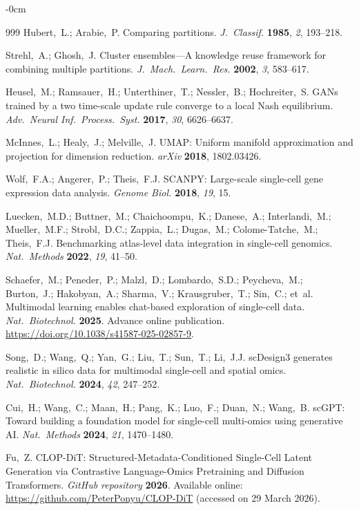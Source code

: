 \documentclass[genes,article,submit,pdftex,oneauthor]{Definitions/mdpi}
\begin{document}
\begin{adjustwidth}{-\extralength}{0cm}
\begin{thebibliography}{999}
Hubert,~L.; Arabie,~P. Comparing partitions. {\em J.\ Classif.} {\bf 1985}, {\em 2}, 193--218.

Strehl,~A.; Ghosh,~J. Cluster ensembles---A knowledge reuse framework for combining multiple partitions. {\em J.\ Mach.\ Learn.\ Res.} {\bf 2002}, {\em 3}, 583--617.

Heusel,~M.; Ramsauer,~H.; Unterthiner,~T.; Nessler,~B.; Hochreiter,~S. GANs trained by a two time-scale update rule converge to a local Nash equilibrium. {\em Adv.\ Neural Inf.\ Process.\ Syst.} {\bf 2017}, {\em 30}, 6626--6637.

McInnes,~L.; Healy,~J.; Melville,~J. UMAP: Uniform manifold approximation and projection for dimension reduction. {\em arXiv} {\bf 2018}, 1802.03426.

Wolf,~F.A.; Angerer,~P.; Theis,~F.J. SCANPY: Large-scale single-cell gene expression data analysis. {\em Genome Biol.} {\bf 2018}, {\em 19}, 15.

Luecken,~M.D.; Buttner,~M.; Chaichoompu,~K.; Danese,~A.; Interlandi,~M.; Mueller,~M.F.; Strobl,~D.C.; Zappia,~L.; Dugas,~M.; Colome-Tatche,~M.; Theis,~F.J. Benchmarking atlas-level data integration in single-cell genomics. {\em Nat.\ Methods} {\bf 2022}, {\em 19}, 41--50.

Schaefer,~M.; Peneder,~P.; Malzl,~D.; Lombardo,~S.D.; Peycheva,~M.; Burton,~J.; Hakobyan,~A.; Sharma,~V.; Krausgruber,~T.; Sin,~C.; et~al. Multimodal learning enables chat-based exploration of single-cell data. {\em Nat.\ Biotechnol.} {\bf 2025}. Advance online publication. \url{https://doi.org/10.1038/s41587-025-02857-9}.

Song,~D.; Wang,~Q.; Yan,~G.; Liu,~T.; Sun,~T.; Li,~J.J. scDesign3 generates realistic in silico data for multimodal single-cell and spatial omics. {\em Nat.\ Biotechnol.} {\bf 2024}, {\em 42}, 247--252.

Cui,~H.; Wang,~C.; Maan,~H.; Pang,~K.; Luo,~F.; Duan,~N.; Wang,~B. scGPT: Toward building a foundation model for single-cell multi-omics using generative AI. {\em Nat.\ Methods} {\bf 2024}, {\em 21}, 1470--1480.

Fu,~Z. CLOP-DiT: Structured-Metadata-Conditioned Single-Cell Latent Generation via Contrastive Language-Omics Pretraining and Diffusion Transformers. {\em GitHub repository} {\bf 2026}. Available online: \url{https://github.com/PeterPonyu/CLOP-DiT} (accessed on 29 March 2026).


\end{thebibliography}
\end{adjustwidth}
\end{document}
